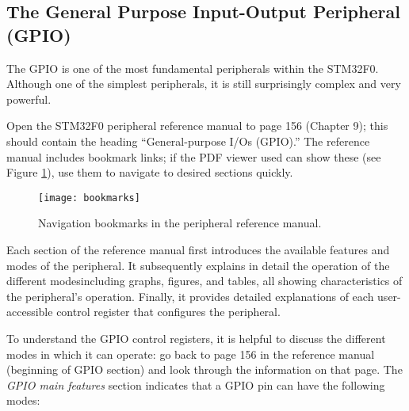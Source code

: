 \documentclass[openany,11pt,fleqn]{book} %
\begin{document}
\subsection{The General Purpose Input-Output Peripheral (GPIO)\label{GPIO_subsection}}


The GPIO is one of the most fundamental peripherals within the STM32F0. Although one of the simplest peripherals, it is still surprisingly complex and very powerful.

Open the STM32F0 peripheral reference manual to page 156 (Chapter 9); this should contain the heading ``General-purpose I/Os (GPIO).'' The reference manual includes bookmark links; if the PDF viewer used can show these (see Figure \ref{bookmarks}), use them to navigate to desired sections quickly.

\begin{figure}[]
    \centering\texttt{[image: bookmarks]}
    \caption{Navigation bookmarks in the peripheral reference manual.}
    \label{bookmarks}
\end{figure}

Each section of the reference manual first introduces the available features and modes of the peripheral. It subsequently explains in detail the operation of the different modes\textemdash including graphs, figures, and tables, all showing characteristics of the peripheral's operation. Finally, it provides detailed explanations of each user-accessible control register that configures the peripheral.

To understand the GPIO control registers, it is helpful to discuss the different modes in which it can operate: go back to page 156 in the reference manual (beginning of GPIO section) and look through the information on that page.
The \textit{GPIO main features} section indicates that a GPIO pin can have the following modes:
\end{document}
